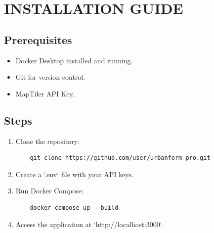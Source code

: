 \documentclass[12pt,a4paper]{report}
\begin{document}
\chapter{INSTALLATION GUIDE}
\section{Prerequisites}
\begin{itemize}
    \item Docker Desktop installed and running.
    \item Git for version control.
    \item MapTiler API Key.
\end{itemize}

\section{Steps}
\begin{enumerate}
    \item Clone the repository:
    \begin{verbatim}
    git clone https://github.com/user/urbanform-pro.git
    \end{verbatim}
    \item Create a `.env` file with your API keys.
    \item Run Docker Compose:
    \begin{verbatim}
    docker-compose up --build
    \end{verbatim}
    \item Access the application at `http://localhost:3000`.
\end{enumerate}

\renewcommand{\bibname}{REFERENCES}


\end{document}
